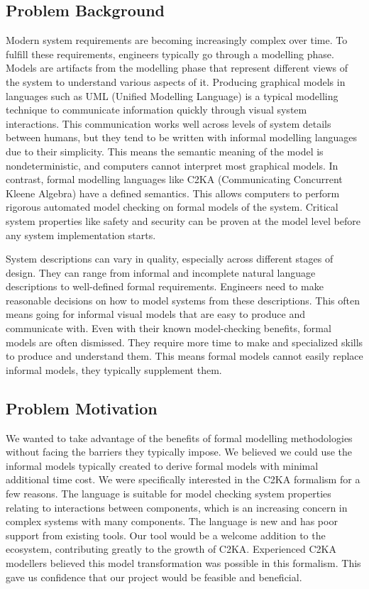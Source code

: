 \subsection{Problem Background}\label{subsec:problem-background}
Modern system requirements are becoming increasingly complex over time.
To fulfill these requirements, engineers typically go through a modelling phase.
Models are artifacts from the modelling phase that represent different views of the system to understand various aspects of it.
Producing graphical models in languages such as UML (Unified Modelling Language) is a typical modelling technique to communicate information quickly through visual system interactions.
This communication works well across levels of system details between humans,
but they tend to be written with informal modelling languages due to their simplicity.
This means the semantic meaning of the model is nondeterministic, and computers cannot interpret most graphical models.
In contrast, formal modelling languages like C2KA (Communicating Concurrent Kleene Algebra) have a defined semantics.
This allows computers to perform rigorous automated model checking on formal models of the system.
Critical system properties like safety and security can be proven at the model level before any system implementation starts.

System descriptions can vary in quality, especially across different stages of design.
They can range from informal and incomplete natural language descriptions
to well-defined formal requirements.
Engineers need to make reasonable decisions on how to model systems from these descriptions.
This often means going for informal visual models that are easy to produce and communicate with.
Even with their known model-checking benefits, formal models are often dismissed.
They require more time to make and specialized skills to produce and understand them.
This means formal models cannot easily replace informal models, they typically supplement them.

\subsection{Problem Motivation}\label{subsec:problem-motivation}
We wanted to take advantage of the benefits of formal modelling methodologies without facing the barriers they typically impose.
We believed we could use the informal models typically created to derive formal models with minimal additional time cost.
We were specifically interested in the C2KA formalism for a few reasons.
The language is suitable for model checking system properties relating to interactions between components, which is an increasing concern in complex systems with many components.
The language is new and has poor support from existing tools.
Our tool would be a welcome addition to the ecosystem, contributing greatly to the growth of C2KA.
Experienced C2KA modellers believed this model transformation was possible in this formalism.
This gave us confidence that our project would be feasible and beneficial.

